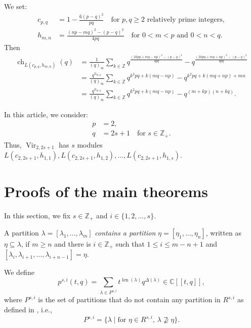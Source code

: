 \documentclass[a4paper, 12pt, reqno]{amsart}
\theoremstyle{remark}
\DeclareMathOperator{\Vir}{Vir}
\DeclareMathOperator{\ch}{ch}
\DeclareMathOperator{\len}{len}
\begin{document}
We set:
\begin{align*}
  c_{p, q} &= 1 - \frac{6(p - q)^2}{pq} \quad \text{for $p, q \ge 2$ relatively prime integers}, \\
  h_{m, n} &= \frac{(np - mq)^2 - (p - q)^2}{4pq} \quad \text{for $0 < m < p$ and $0 < n < q$.}
\end{align*}
Then
\begin{align*}
  \ch_{L(c_{p, q}, h_{m, n})}(q) &= \frac{1}{(q)_{\infty}}\sum_{k \in \mathbb{Z}}q^{\frac{(2kpq + mq - np)^2 - (p - q)^2}{4pq}} - q^{\frac{(2kpq + mq + np)^2 - (p - q)^2}{4pq}} \\
                                 &= \frac{q^{h_{m, n}}}{(q)_{\infty}}\sum_{k \in \mathbb{Z}}q^{k^2pq + k(mq - np)}-q^{k^2pq + k(mq + np) + mn} \\
                                 &= \frac{q^{h_{m, n}}}{(q)_{\infty}}\sum_{k \in \mathbb{Z}}q^{k^2pq + k(mq - np)}-q^{(m + kp)(n + kq)}.
\end{align*}

In this article, we consider:
\begin{align*}
  p &= 2, \\
  q &= 2s + 1 \quad \text{for $s \in \mathbb{Z}_+$}.
\end{align*}
Thus, $\Vir_{2, 2s + 1}$ has $s$ modules $L(c_{2, 2s + 1}, h_{1, 1}), L(c_{2, 2s + 1}, h_{1, 2}), \dots, L(c_{2, 2s + 1}, h_{1, s})$.

\section{Proofs of the main theorems}
\label{sec:proofs-main-theorems}

In this section, we fix $s \in \mathbb{Z}_+$ and $i \in \{1, 2, \dots, s\}$.

A partition $\lambda = [\lambda_1, \dots, \lambda_m]$ \emph{contains a partition} $\eta = [\eta_1, \dots, \eta_n]$, written as $\eta \subseteq \lambda$, if $m \ge n$ and there is $i \in \mathbb{Z}_+$ such that $1 \le i \le m - n + 1$ and $[\lambda_i, \lambda_{i + 1}, \dots, \lambda_{i + n - 1}] = \eta$.

We define
\begin{equation*}
  p^{s, i}(t, q) = \sum_{\lambda \in P^{s, i}}t^{\len(\lambda)}q^{\Delta(\lambda)} \in \mathbb{C}[[t, q]],
\end{equation*}
where $P^{s, i}$ is the set of partitions that do not contain any partition in $R^{s, i}$ as defined in , i.e.,
\begin{equation*}
  P^{s, i} = \{\lambda \mid \text{for $\eta \in R^{s, i}$, $\lambda \nsupseteq \eta$}\}.
\end{equation*}
\end{document}
